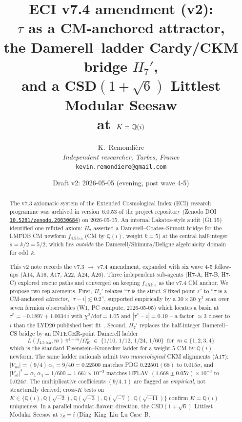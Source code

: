 \documentclass[a4paper,11pt]{article}
\title{ECI v7.4 amendment (v2):\\
       $\tau$ as a CM-anchored attractor,\\
       the Damerell--ladder Cardy/CKM bridge $H_7'$,\\
       and a CSD$(1+\sqrt{6})$ Littlest Modular Seesaw\\
       at $K=\Qi$}
\author{%
  K.~Remondi\`ere%
  \\[2ex]
  \small\textit{Independent researcher, Tarbes, France}\\
  \small\texttt{kevin.remondiere@gmail.com}
}
\date{Draft v2: 2026-05-05 (evening, post wave 4-5)}
\newcommand{\OmK}{\Omega_K}
\newcommand{\fLM}{f_{\text{4.5.b.a}}}
\newcommand{\Qi}{\mathbb{Q}(i)}
\newcommand{\Zeno}{\href{https://doi.org/10.5281/zenodo.20030684}{\texttt{10.5281/zenodo.20030684}}}
\theoremstyle{definition}
\theoremstyle{remark}
\begin{document}
\maketitle

\begin{abstract}
The v7.3 axiomatic system of the Extended Cosmological Index (ECI)
research programme was archived in version~6.0.53 of the project
repository (Zenodo DOI \Zeno) on 2026-05-05.  An internal Lakatos-style
audit (G1.15) identified one refuted axiom: $H_7$ asserted a
Damerell--Coates--Sinnott bridge for the LMFDB CM newform
$\fLM$ (CM by $\Qi$, weight $k=5$) at the central
half-integer $s=k/2=5/2$, which lies \emph{outside} the
Damerell/Shimura/Deligne algebraicity domain for odd~$k$.
\par
This v2 note records the v7.3 $\to$ v7.4 amendment, expanded with
six wave 4-5 follow-ups (A14, A16, A17, A22, A24, A26).  Three
independent sub-agents (H7-A, H7-B, H7-C) explored rescue paths and
converged on keeping $\fLM$ as the v7.4 CM anchor.  We propose two
replacements.  First, $H_5'$ relaxes ``$\tau$ is the strict $S$-fixed
point $i$'' to ``$\tau$ is a CM-anchored \emph{attractor},
$|\tau-i|\lesssim 0.2$'', supported empirically by a $30\times 30$
$\chi^2$ scan over seven fermion observables (W1, PC compute,
2026-05-05) which locates a basin at
$\tau^{*} = -0.1897 + 1.0034\,i$ with $\chi^2/\mathrm{dof}=1.05$ and
$|\tau^{*}-i|=0.19$ -- a factor $\approx\!3$ closer to $i$ than the
LYD20 published best fit~\cite{LYD20}.  Second, $H_7'$ replaces the
half-integer Damerell--CS bridge by an INTEGER-point Damerell ladder
\[
\boxed{\;\;L(\fLM, m)\,\pi^{4-m}/\OmK^{4} \;\in\; \{1/10,\,1/12,\,1/24,\,1/60\}
       \;\;\text{for}\;\; m\in\{1,2,3,4\}\;\;}
\]
which is the standard Eisenstein--Kronecker ladder for a weight-$5$
CM-by-$\Qi$ newform.  The same ladder rationals admit two
\emph{numerological} CKM alignments (A17): $|V_{us}| = (9/4)\,\alpha_1
= 9/40 = 0.22500$ matches PDG $0.22501(68)$ to $0.015\sigma$, and
$|V_{cb}|^{2} = \alpha_1\,\alpha_4 = 1/600 = 1.667\times 10^{-3}$
matches HFLAV $(1.668\pm 0.057)\times 10^{-3}$ to $0.024\sigma$.  The
multiplicative coefficients $(9/4, 1)$ are flagged as \emph{empirical},
not structurally derived; cross-$K$ tests on
$K\in\{\Qi,\mathbb{Q}(\sqrt{-2}),\mathbb{Q}(\sqrt{-3}),
\mathbb{Q}(\sqrt{-7}),\mathbb{Q}(\sqrt{-11})\}$ confirm $K=\Qi$
uniqueness.  In a parallel modular-flavour direction, the CSD$(1+\sqrt
6)$ Littlest Modular Seesaw at $\tau_S=i$ (Ding--King--Liu--Lu Case~B,

\end{abstract}
\end{document}
